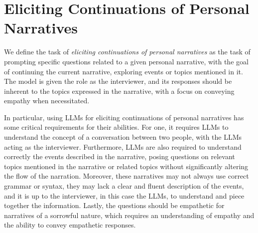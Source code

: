 \section{Eliciting Continuations of Personal Narratives}
We define the task of \emph{eliciting continuations of personal narratives} as the task of prompting specific questions related to a given personal narrative, with the goal of continuing the current narrative, exploring events or topics mentioned in it. The model is given the role as the interviewer, and its responses should be inherent to the topics expressed in the narrative, with a focus on conveying empathy when necessitated.

In particular, using LLMs for eliciting continuations of personal narratives has some critical requirements for their abilities. For one, it requires LLMs to understand the concept of a conversation between two people, with the LLMs acting as the interviewer. Furthermore, LLMs are also required to understand correctly the events described in the narrative, posing questions on relevant topics mentioned in the narrative or related topics without significantly altering the flow of the narration. Moreover, these narratives may not always use correct grammar or syntax, they may lack a clear and fluent description of the events, and it is up to the interviewer, in this case the LLMs, to understand and piece together the information. Lastly, the questions should be empathetic for narratives of a sorrowful nature, which requires an understanding of empathy and the ability to convey empathetic responses.

